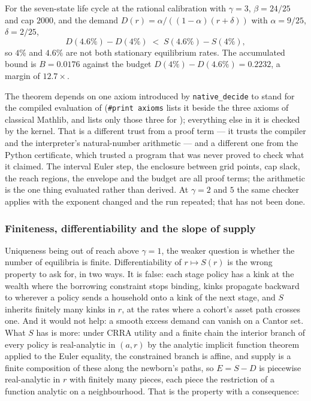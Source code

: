 \begin{theorem}[The certified increment at $\gamma=3$]\label{thm:encllean}
For the seven-state life cycle at the rational calibration with $\gamma=3$, $\beta=24/25$ and cap
$2000$, and the demand $D(r)=\alpha/((1-\alpha)(r+\delta))$ with $\alpha=9/25$, $\delta=2/25$,
\[
D(4.6\%)-D(4\%)\;<\;S(4.6\%)-S(4\%),
\]
so $4\%$ and $4.6\%$ are not both stationary equilibrium rates. The accumulated bound is
$B=0.0176$ against the budget $D(4\%)-D(4.6\%)=0.2232$, a margin of $12.7\times$.
\end{theorem}

The theorem depends on one axiom introduced by \texttt{native\_decide} to stand for the compiled
evaluation of  (\texttt{\#print axioms} lists it beside the three axioms of
classical Mathlib, and lists only those three for ); everything
else in it is checked by the kernel.
That is a different trust from a proof term --- it trusts the compiler and the interpreter's
natural-number arithmetic --- and a different one from the Python certificate, which trusted a
program that was never proved to check what it claimed. The interval Euler step, the enclosure
between grid points, cap slack, the reach regions, the envelope and the budget are all proof terms;
the arithmetic is the one thing evaluated rather than derived. At $\gamma=2$ and $5$ the same
checker applies with the exponent changed and the run repeated; that has not been done.

\subsubsection*{Finiteness, differentiability and the slope of supply}\label{sec:finite}

Uniqueness being out of reach above $\gamma=1$, the weaker question is whether the number of
equilibria is finite. Differentiability of $r\mapsto S(r)$ is the wrong property to ask for, in two
ways. It is false: each stage policy has a kink at the wealth where the borrowing constraint stops
binding, kinks propagate backward to wherever a policy sends a household onto a kink of the next
stage, and $S$ inherits finitely many kinks in $r$, at the rates where a cohort's asset path crosses
one. And it would not help: a smooth excess demand can vanish on a Cantor set. What $S$ has is
more: under CRRA utility and a finite chain the interior branch of every policy is real-analytic in
$(a,r)$ by the analytic implicit function theorem applied to the Euler equality, the constrained
branch is affine, and supply is a finite composition of these along the newborn's paths, so $E=S-D$
is piecewise real-analytic in $r$ with finitely many pieces, each piece the restriction of a
function analytic on a neighbourhood. That is the property with a consequence:

